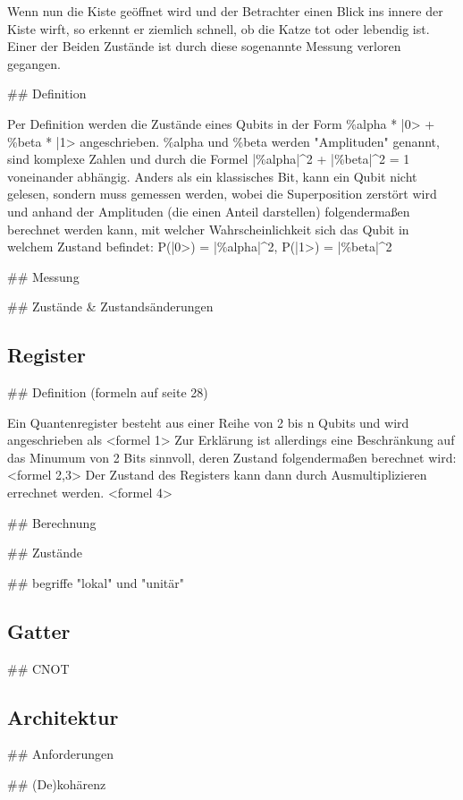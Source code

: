 Wenn nun die Kiste geöffnet wird und der Betrachter einen Blick ins innere der Kiste wirft, so erkennt er ziemlich schnell, ob die Katze tot oder lebendig ist. Einer der Beiden Zustände ist durch diese sogenannte Messung verloren gegangen.

## Definition

Per Definition werden die Zustände eines Qubits in der Form \%alpha * |0> + \%beta * |1> angeschrieben.
\%alpha und \%beta werden "Amplituden" genannt, sind komplexe Zahlen und durch die Formel |\%alpha|^2 + |\%beta|^2 = 1 voneinander abhängig.
Anders als ein klassisches Bit, kann ein Qubit nicht gelesen, sondern muss gemessen werden, wobei die Superposition zerstört wird und anhand der Amplituden (die einen Anteil darstellen) folgendermaßen berechnet werden kann, mit welcher Wahrscheinlichkeit sich das Qubit in welchem Zustand befindet: P(|0>) = |\%alpha|^2, P(|1>) = |\%beta|^2

## Messung

## Zustände & Zustandsänderungen

\subsection{Register}
\label{sec:Register}

## Definition (formeln auf seite 28)

Ein Quantenregister besteht aus einer Reihe von 2 bis n Qubits und wird angeschrieben als <formel 1>
Zur Erklärung ist allerdings eine Beschränkung auf das Minumum von 2 Bits sinnvoll, deren Zustand folgendermaßen berechnet wird: <formel 2,3>
Der Zustand des Registers kann dann durch Ausmultiplizieren errechnet werden. <formel 4>

## Berechnung

## Zustände

## begriffe "lokal" und "unitär"


\subsection{Gatter}
\label{sec:Gatter}

## CNOT


\subsection{Architektur}
\label{sec:Architektur}

## Anforderungen

## (De)kohärenz

